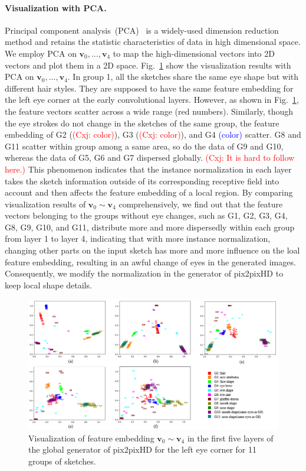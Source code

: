 \documentclass[10pt,twocolumn,letterpaper]{article}
\newcommand{\cxj}[1]{\textcolor{red}{(Cxj: #1)}}
\newcommand{\nt}[1]{\textcolor{blue}{(#1)}}
\begin{document}
\paragraph{Visualization with PCA.} Principal component analysis~(PCA)~\cite{pca} is a widely-used dimension reduction method and retains the statistic characteristics of data in high dimensional space. 
We employ PCA on $\boldsymbol{v}_0,\ldots, \boldsymbol{v}_4$ to map the high-dimensional vectors into 2D vectors and plot them in a 2D space. 
Fig.~\ref{fig:pca_0} show the visualization results with PCA on $\boldsymbol{v}_0,\ldots,\boldsymbol{v}_4$. 
%
In group 1, all the sketches share the same eye shape but with different hair styles. They are supposed to have the same feature embedding for the left eye corner at the early convolutional layers. However, as shown in Fig.~\ref{fig:pca_0}, the feature vectors scatter across a wide range (red numbers). 
Similarly, though the eye strokes do not change in the sketches of the same group, the feature embedding of G2 (\cxj{color}), G3 (\cxj{color}), and G4 \nt{color} scatter.
%
G8 and G11 scatter within group among a same area, so do the data of G9 and G10, whereas the data of G5, G6 and G7 dispersed globally.
\cxj{It is hard to follow here.}
This phenomenon indicates that the instance normalization in each layer takes the sketch information outside of its corresponding receptive field into account and then affects the feature embedding of a local region. 
By comparing visualization results of $\boldsymbol{v}_0\sim\boldsymbol{v}_4$ comprehensively, we find out that the feature vectors belonging to the groups without eye changes, such as G1, G2, G3, G4, G8, G9, G10, and G11, distribute more and more dispersedly within each group from layer 1 to layer 4, indicating that with more instance normalization, changing other parts on the input sketch has more and more influence on the loal feature embedding, resulting in an awful change of eyes in the generated images.
Consequently, we modify the normalization in the generator of pix2pixHD to keep local shape details. 

\begin{figure}[htb]
	\centering
	\includegraphics[width=0.9 \textwidth]{pca_0.png}
	\caption{Visualization of feature embedding $\boldsymbol{v}_0\sim\boldsymbol{v}_4$ in the first five layers of the global generator of pix2pixHD for the left eye corner for 11 groups of sketches.  }
	\label{fig:pca_0}
\end{figure}      
\end{document}
